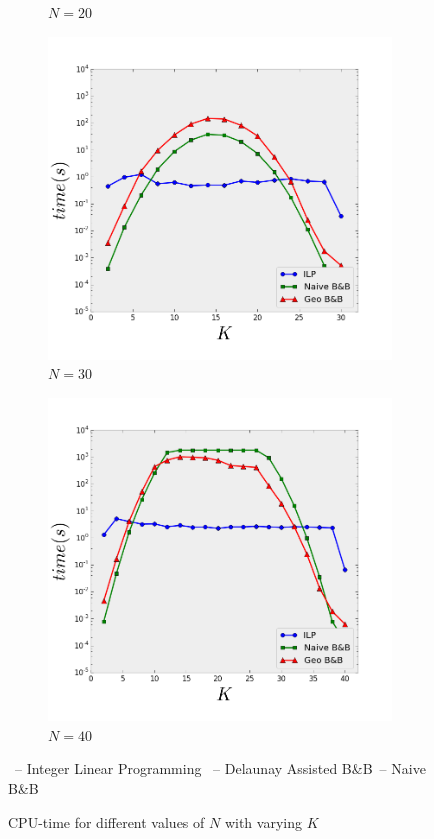 \begin{figure}[t]
\begin{subfigure}[b]{0.4\linewidth}
    \caption{$N=20$} 
    \label{fig:fixed_n:b} 
    \vspace{4ex}
  \end{subfigure} 
  \begin{subfigure}[b]{0.4\linewidth}
    \centering
    \includegraphics[width=0.9\linewidth]{Pictures/n30} 
    \caption{$N=30$} 
    \label{fig:fixed_n:c} 
  \end{subfigure}%
  \begin{subfigure}[b]{0.4\linewidth}
    \centering
    \includegraphics[width=0.9\linewidth]{Pictures/n40} 
    \caption{$N=40$} 
    \label{fig:fixed_n:d} 
  \end{subfigure} 
  \vspace{2ex}
  \begin{center}
  \textcolor{blue}{\cmark}\ -- Integer Linear Programming \quad   \textcolor{red}{\tmark}\ -- Delaunay Assisted B\&B\quad \textcolor{green}{\smark}\ -- Naive B\&B
  \end{center}
  \caption{CPU-time for different values of $N$ with varying $K$}
  \label{fig:fixed_n} 
\end{figure}

